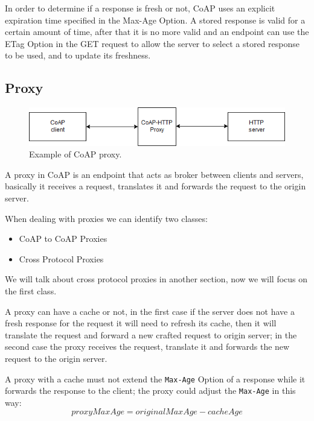	In order to determine if a response is fresh or not, CoAP uses an explicit expiration time specified in the Max-Age Option.\newline
	A stored response is valid for a certain amount of time, after that it is no more valid and an endpoint can use the ETag Option in the GET request to allow the server to select a stored response to be used, and to update its freshness.\newline
	
	\subsection{Proxy}
	
	\begin{figure}
		\includegraphics[width=\linewidth]{coap-img1.png}
		\caption{Example of CoAP proxy.}
		\label{fig:coap1}
	\end{figure}

	A proxy in CoAP is an endpoint that acts as broker between clients and servers, basically it receives a request, translates it and forwards the request to the origin server.
	
	When dealing with proxies we can identify two classes:
	\begin{itemize}
		\item CoAP to CoAP Proxies
		\item Cross Protocol Proxies
	\end{itemize}
	
	We will talk about cross protocol proxies in another section, now we will focus on the first class.
	
	A proxy can have a cache or not, in the first case if the server does not have a fresh response for the request it will need to refresh its cache, then it will translate the request and forward a new crafted request to origin server; in the second case the proxy receives the request, translate it and forwards the new request to the origin server.
	
	A proxy with a cache must not extend the \texttt{Max-Age} Option of a response while it forwards the response to the client; the proxy could adjust the \texttt{Max-Age} in this way:
	\begin{equation}
		proxyMaxAge=originalMaxAge-cacheAge
	\end{equation}
	
